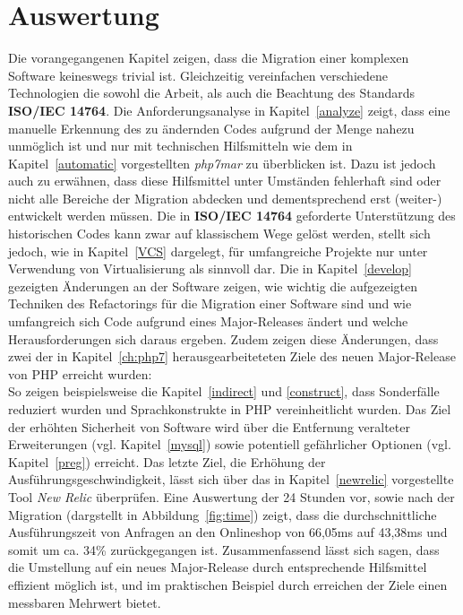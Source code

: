 \chapter{Auswertung}\label{ch:end} 

Die vorangegangenen Kapitel zeigen, dass die Migration einer komplexen Software keineswegs trivial ist. Gleichzeitig vereinfachen verschiedene Technologien die 
sowohl die Arbeit, als auch die Beachtung des Standards \textbf{ISO/IEC 14764}. Die Anforderungsanalyse in Kapitel~\ref{analyze} zeigt, dass eine manuelle Erkennung 
des zu ändernden Codes aufgrund der Menge nahezu unmöglich ist und nur mit technischen Hilfsmitteln wie dem in Kapitel~\ref{automatic} vorgestellten \textit{php7mar} 
zu überblicken ist. Dazu ist jedoch auch zu erwähnen, dass diese Hilfsmittel unter Umständen fehlerhaft sind oder nicht alle Bereiche der Migration abdecken und 
dementsprechend erst (weiter-) entwickelt werden müssen. Die in \textbf{ISO/IEC 14764} geforderte Unterstützung des historischen Codes kann zwar auf klassischem Wege 
gelöst werden, stellt sich jedoch, wie in Kapitel~\ref{VCS} dargelegt, für umfangreiche Projekte nur unter Verwendung von Virtualisierung als sinnvoll dar. 
Die in Kapitel~\ref{develop} gezeigten Änderungen an der Software zeigen, wie wichtig die aufgezeigten Techniken des Refactorings für die Migration einer Software sind
und wie umfangreich sich Code aufgrund eines Major-Releases ändert und welche Herausforderungen sich daraus ergeben.
Zudem zeigen diese Änderungen, dass zwei der in Kapitel~\ref{ch:php7} herausgearbeiteteten Ziele des neuen Major-Release von \ac{PHP} erreicht wurden: \\
So zeigen beispielsweise die Kapitel~\ref{indirect} und \ref{construct}, dass Sonderfälle reduziert wurden und Sprachkonstrukte in \ac{PHP} vereinheitlicht wurden. 
Das Ziel der erhöhten Sicherheit von Software wird über die Entfernung veralteter Erweiterungen (vgl. Kapitel~\ref{mysql}) sowie potentiell gefährlicher Optionen (vgl. Kapitel~\ref{preg}) 
erreicht. Das letzte Ziel, die Erhöhung der Ausführungsgeschwindigkeit, lässt sich über das in Kapitel~\ref{newrelic} vorgestellte Tool \textit{New Relic} überprüfen. 
Eine Auswertung der 24 Stunden vor, sowie nach der Migration (dargstellt in Abbildung~\ref{fig:time}) zeigt, dass die durchschnittliche Ausführungszeit von Anfragen an den Onlineshop 
von 66,05ms auf 43,38ms und somit um ca. 34\% zurückgegangen ist. Zusammenfassend lässt sich sagen, dass die Umstellung auf ein neues Major-Release durch entsprechende 
Hilfsmittel effizient möglich ist, und im praktischen Beispiel durch erreichen der Ziele einen messbaren Mehrwert bietet.

